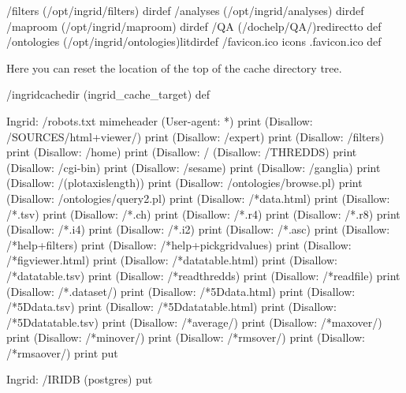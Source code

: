 \documentclass{article}
\begin{document}
\begin{ingrid}
/filters (/opt/ingrid/filters) dirdef
/analyses (/opt/ingrid/analyses) dirdef
/maproom (/opt/ingrid/maproom) dirdef
/QA { (/dochelp/QA/)redirectto } def
/ontologies (/opt/ingrid/ontologies)litdirdef
/favicon.ico {icons .favicon.ico} def
\end{ingrid}
Here you can reset the location of the top of the cache directory tree.
\begin{ingrid}
/ingridcachedir ({{ingrid_cache_target}}) def
\end{ingrid}
\begin{ingrid}
Ingrid: /robots.txt {
mimeheader
(User-agent: *\n) print
(Disallow: /SOURCES/html+viewer/\n) print
(Disallow: /expert\n) print
(Disallow: /filters\n) print
(Disallow: /home\n) print
(Disallow: /%
(Disallow: /THREDDS\n) print
(Disallow: /cgi-bin\n) print
(Disallow: /sesame\n) print
(Disallow: /ganglia\n) print
(Disallow: /(plotaxislength)\n) print
(Disallow: /ontologies/browse.pl\n) print
(Disallow: /ontologies/query2.pl\n) print
(Disallow: /*data.html\n) print
(Disallow: /*.tsv\n) print
(Disallow: /*.ch\n) print
(Disallow: /*.r4\n) print
(Disallow: /*.r8\n) print
(Disallow: /*.i4\n) print
(Disallow: /*.i2\n) print
(Disallow: /*.asc\n) print
(Disallow: /*help+filters\n) print
(Disallow: /*help+pickgridvalues\n) print
(Disallow: /*figviewer.html\n) print
(Disallow: /*datatable.html\n) print
(Disallow: /*datatable.tsv\n) print
(Disallow: /*readthredds\n) print
(Disallow: /*readfile\n) print
(Disallow: /*.dataset/\n) print
(Disallow: /*5Ddata.html\n) print
(Disallow: /*5Ddata.tsv\n) print
(Disallow: /*5Ddatatable.html\n) print
(Disallow: /*5Ddatatable.tsv\n) print
(Disallow: /*average/\n) print
(Disallow: /*maxover/\n) print
(Disallow: /*minover/\n) print
(Disallow: /*rmsover/\n) print
(Disallow: /*rmsaover/\n) print
} put
\end{ingrid}

\begin{ingrid}
Ingrid: /IRIDB (postgres) put
\end{ingrid}
\end{document}
